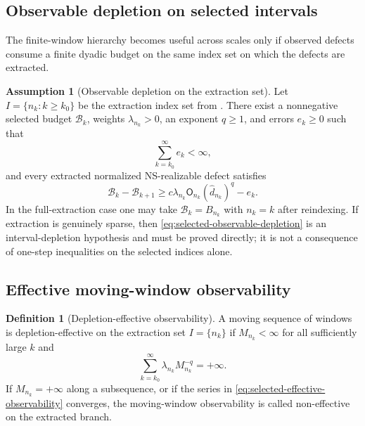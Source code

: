 \documentclass[11pt]{article}
\numberwithin{equation}{section}
\theoremstyle{plain}
\theoremstyle{definition}
\newtheorem{definition}[theorem]{Definition}
\newtheorem{assumption}[theorem]{Assumption}
\theoremstyle{remark}
\begin{document}
\subsection{Observable depletion on selected intervals}

The finite-window hierarchy becomes useful across scales only if observed
defects consume a finite dyadic budget on the same index set on which the
defects are extracted.

\begin{assumption}[Observable depletion on the extraction set]
\label{ass:observable-depletion-final}
Let \(I=\{n_k:k\ge k_0\}\) be the extraction index set from
.  There exist a nonnegative selected
budget \(\mathscr B_k\), weights \(\lambda_{n_k}>0\), an exponent \(q\ge1\), and
errors \(e_k\ge0\) such that
\begin{equation}
        \sum_{k=k_0}^{\infty}e_k<\infty,
        \label{eq:selected-errors-summable}
\end{equation}
and every extracted normalized NS-realizable defect satisfies
\begin{equation}
        \mathscr B_k-\mathscr B_{k+1}
        \ge
        c\lambda_{n_k}\mathsf O_{n_k}(\widehat d_{n_k})^q-e_k.
        \label{eq:selected-observable-depletion}
\end{equation}
In the full-extraction case one may take \(\mathscr B_k=B_{n_k}\) with
\(n_k=k\) after reindexing.  If extraction is genuinely sparse, then
\eqref{eq:selected-observable-depletion} is an interval-depletion hypothesis
and must be proved directly; it is not a consequence of one-step inequalities
on the selected indices alone.
\end{assumption}

\subsection{Effective moving-window observability}

\begin{definition}[Depletion-effective observability]
\label{def:depletion-effective-observability}
A moving sequence of windows is depletion-effective on the extraction set
\(I=\{n_k\}\) if \(M_{n_k}<\infty\) for all sufficiently large \(k\) and
\begin{equation}
        \sum_{k=k_0}^{\infty}\lambda_{n_k}M_{n_k}^{-q}=+\infty.
        \label{eq:selected-effective-observability}
\end{equation}
If \(M_{n_k}=+\infty\) along a subsequence, or if the series in
\eqref{eq:selected-effective-observability} converges, the moving-window
observability is called non-effective on the extracted branch.
\end{definition}
\end{document}

